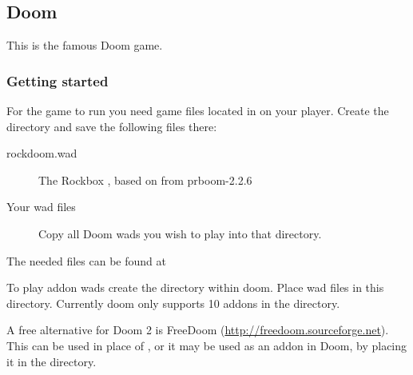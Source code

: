 \subsection{Doom}
This is the famous Doom game.

\subsubsection{Getting started}
For the game to run you need  game files located in
 on your player. Create the directory and save the
following files there:
\begin{description}
\item[rockdoom.wad] The Rockbox , based on 
from prboom-2.2.6
\item[Your wad files] Copy all Doom wads you wish to play into that directory.
\end{description}
The needed files can be found at

To play addon wads create the  directory within doom. 
Place wad files in this directory. Currently doom only supports 10 addons 
in the directory.

A free alternative for Doom 2 is FreeDoom (\url{http://freedoom.sourceforge.net}).
This can be used in place of , or it may be used as an addon in 
Doom, by placing it in the  directory.

